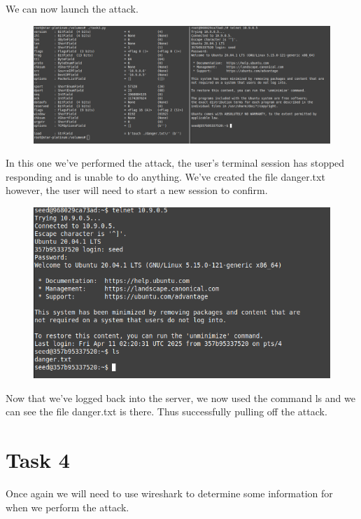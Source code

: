 \documentclass[12pt]{article}
\begin{document}
We can now launch the attack.

\begin{figure}[!ht]
  \includegraphics*[scale=.4]{Task32AttackPerform.png}
\end{figure}

In this one we've performed the attack, the user's terminal session has stopped responding and is unable to do anything. We've created the file danger.txt however, the 
user will need to start a new session to confirm.\\


\begin{figure}[!ht]
  \includegraphics*[scale=.5]{Task32RIGHTafterAttack.png}
\end{figure}
\newpage
Now that we've logged back into the server, we now used the command ls and we can see the file danger.txt is there. Thus successfully pulling off the attack.\\



\section*{Task 4}
Once again we will need to use wireshark to determine some information for when we perform the attack.\\
\end{document}
